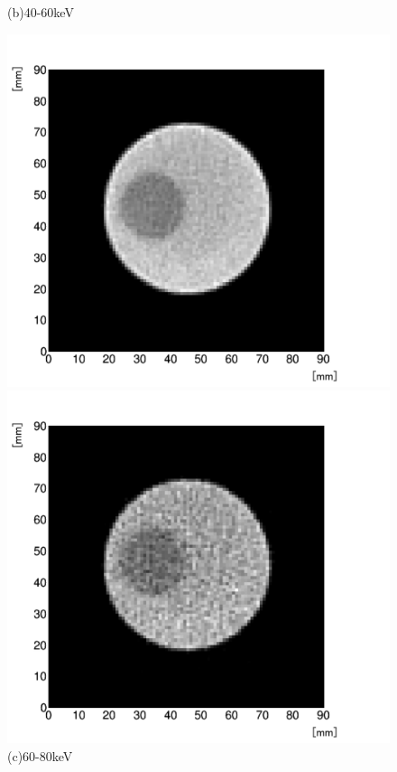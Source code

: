 \begin{figure}[H]
\begin{minipage}{0.5\hsize}
\begin{center}
  \end{center}
\vspace{-1cm}
\caption*{(b)40-60keV}
 \end{minipage}
 \begin{minipage}{0.5\hsize}
  \begin{center}
   \includegraphics[bb=0.000000 0.000000 586.511515 539.955364,width=1.0\hsize]{image2/chapter5/low_contrast_60-90.png}
  \end{center}  
\vspace{-1cm}
\caption*{(c)60-80keV}
 \end{minipage}
 \begin{minipage}{0.5\hsize}
  \begin{center}
   \includegraphics[bb=0.000000 0.000000 586.511515 539.955364,width=1.0\hsize]{image2/chapter5/low_contrast_90-120.png}

\end{center}
\end{minipage}
\end{figure}
